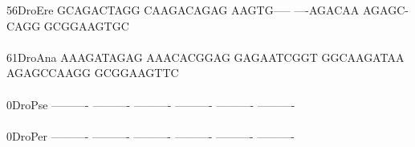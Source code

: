 \documentclass[11pt,twoside,reqno,a4paper]{article}
\begin{document}
{56\hspace*{3\charwidth}DroEre	GCAGACTAGG	CAAGACAGAG	AAGTG-----	----AGACAA	AGAGC-CAGG	GCGGAAGTGC	\\
\hspace*{5\charwidth}\hspace*{7\charwidth}\hspace*{1\charwidth}\hspace*{1\charwidth}\hspace*{1\charwidth}\hspace*{1\charwidth}\hspace*{1\charwidth}\hspace*{1\charwidth}\\
61\hspace*{3\charwidth}DroAna	AAAGATAGAG	AAACACGGAG	GAGAATCGGT	GGCAAGATAA	AGAGCCAAGG	GCGGAAGTTC	\\
\hspace*{5\charwidth}\hspace*{7\charwidth}\hspace*{1\charwidth}\hspace*{1\charwidth}\hspace*{1\charwidth}\hspace*{1\charwidth}\hspace*{1\charwidth}\hspace*{1\charwidth}\\
0\hspace*{4\charwidth}DroPse	----------	----------	----------	----------	----------	----------	\\
\hspace*{5\charwidth}\hspace*{7\charwidth}\hspace*{1\charwidth}\hspace*{1\charwidth}\hspace*{1\charwidth}\hspace*{1\charwidth}\hspace*{1\charwidth}\hspace*{1\charwidth}\\
0\hspace*{4\charwidth}DroPer	----------	----------	----------	----------	----------	----------	\\
\hspace*{5\charwidth}\hspace*{7\charwidth}\hspace*{1\charwidth}\hspace*{1\charwidth}\hspace*{1\charwidth}\hspace*{1\charwidth}\hspace*{1\charwidth}\hspace*{1\charwidth}\\
}
\end{document}
